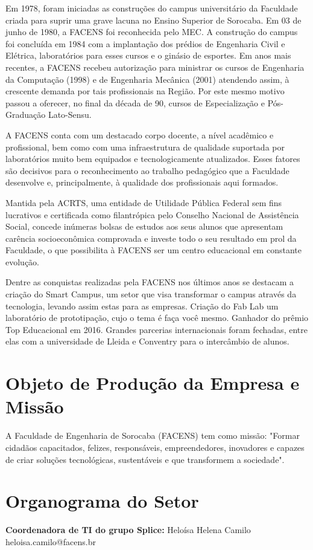 \documentclass[
	12pt,				%
	oneside,			%
	a4paper,			%
	chapter=TITLE,		%
	section=TITLE,		%
	sumario=tradicional %
	english,			%
	french,				%
	spanish,			%
	brazil				%
	]{abntex2}
\begin{document}
Em 1978, foram iniciadas as construções do campus universitário da Faculdade criada para suprir uma grave lacuna no Ensino Superior de Sorocaba. Em 03 de junho de 1980, a FACENS foi reconhecida pelo MEC. A construção do campus foi concluída em 1984 com a implantação dos prédios de Engenharia Civil e Elétrica, laboratórios para esses cursos e o ginásio de esportes.
Em anos mais recentes, a FACENS recebeu autorização para ministrar os cursos de Engenharia da Computação (1998) e de Engenharia Mecânica (2001) atendendo assim, à crescente demanda por tais profissionais na Região. Por este mesmo motivo passou a oferecer, no final da década de 90, cursos de Especialização e Pós-Graduação Lato-Sensu.

A FACENS conta com um destacado corpo docente, a nível acadêmico e profissional, bem como com uma infraestrutura de qualidade suportada por laboratórios muito bem equipados e tecnologicamente atualizados. Esses fatores são decisivos para o reconhecimento ao trabalho pedagógico que a Faculdade desenvolve e, principalmente, à qualidade dos profissionais aqui formados.

Mantida pela ACRTS, uma entidade de Utilidade Pública Federal sem fins lucrativos e certificada como filantrópica pelo Conselho Nacional de Assistência Social, concede inúmeras bolsas de estudos aos seus alunos que apresentam carência socioeconômica comprovada e investe todo o seu resultado em prol da Faculdade, o que possibilita à FACENS ser um centro educacional em constante evolução.

Dentre as conquistas realizadas pela FACENS nos últimos anos se destacam a criação do Smart Campus, um setor que visa transformar o campus através da tecnologia, levando assim estas para as empresas. Criação do Fab Lab um laboratório de prototipação, cujo o tema é faça você mesmo. Ganhador do prêmio Top Educacional em 2016. Grandes parcerias internacionais foram fechadas, entre elas com a universidade de Lleida e Conventry para o intercâmbio de alunos.
\section{Objeto de Produção da Empresa e Missão}
\label{sec:prodmissaoempresa}
A Faculdade de Engenharia de Sorocaba (FACENS) tem como missão: "Formar cidadãos capacitados, felizes, responsáveis, empreendedores, inovadores e capazes de criar soluções tecnológicas, sustentáveis e que transformem a sociedade".

\section{Organograma do Setor}
\label{sec:aempresa}
\textbf{Coordenadora de TI do grupo Splice:} Heloísa Helena Camilo \\
\indent heloisa.camilo@facens.br \\
\end{document}
